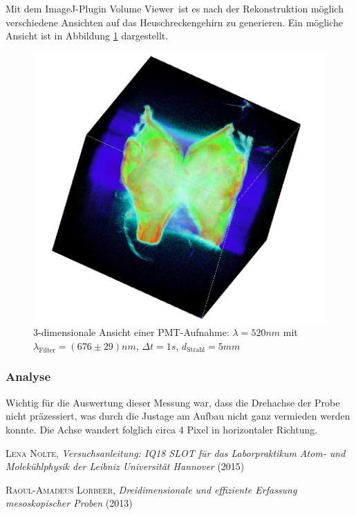 \begin{minipage}{\linewidth}
Mit dem ImageJ-Plugin \glqq Volume Viewer\grqq \, ist es nach der Rekonstruktion möglich verschiedene Ansichten auf das Heuschreckengehirn zu generieren. Ein mögliche Ansicht ist in Abbildung \ref{fig:3d} dargestellt.

\begin{figure}[H]
\centering
\includegraphics[width=\linewidth]{IMAGE/3dtomo.png}
\caption{3-dimensionale Ansicht einer PMT-Aufnahme: $\lambda = 520 \si{nm}$ mit\\ $\lambda_\text{Filter} = (676 \pm 29) \si{nm}$, $\Delta{t} = 1 \si{s}$, $d_\text{Strahl} = 5 \si{mm}$}
	\label{fig:3d}
\end{figure}

\subsubsection{Analyse}
Wichtig für die Auswertung dieser Messung war, dass die Drehachse der Probe nicht präzessiert, was durch die Justage am Aufbau nicht ganz vermieden werden konnte.
Die Achse wandert folglich circa 4 Pixel in horizontaler Richtung.

\end{minipage}

\clearpage
\listoffigures
\begin{thebibliography}{99}
 \textsc{Lena Nolte}, \emph{Versuchsanleitung: IQ18 SLOT für das Laborpraktikum Atom- und Molekühlphysik
der Leibniz Universität Hannover} (2015) 

 \textsc{Raoul-Amadeus Lorbeer}, \emph{Dreidimensionale und effiziente Erfassung mesoskopischer Proben} (2013) 
\end{thebibliography}




